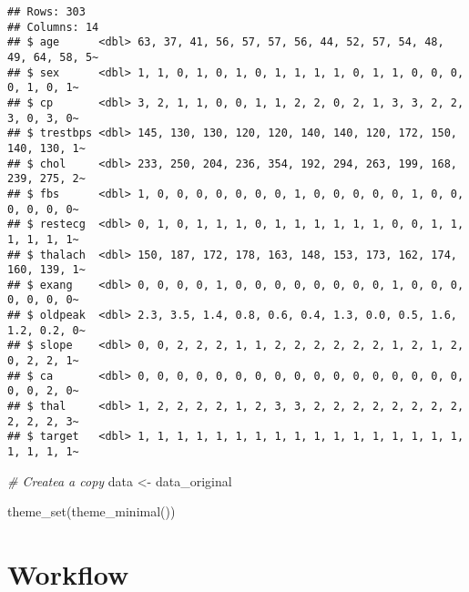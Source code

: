 \documentclass[
]{book}
\newenvironment{Shaded}{\begin{snugshade}}{\end{snugshade}}
\newcommand{\CommentTok}[1]{\textcolor[rgb]{0.56,0.35,0.01}{\textit{#1}}}
\newcommand{\FunctionTok}[1]{\textcolor[rgb]{0.00,0.00,0.00}{#1}}
\newcommand{\NormalTok}[1]{#1}
\newcommand{\OtherTok}[1]{\textcolor[rgb]{0.56,0.35,0.01}{#1}}
\begin{document}
\begin{verbatim}
## Rows: 303
## Columns: 14
## $ age      <dbl> 63, 37, 41, 56, 57, 57, 56, 44, 52, 57, 54, 48, 49, 64, 58, 5~
## $ sex      <dbl> 1, 1, 0, 1, 0, 1, 0, 1, 1, 1, 1, 0, 1, 1, 0, 0, 0, 0, 1, 0, 1~
## $ cp       <dbl> 3, 2, 1, 1, 0, 0, 1, 1, 2, 2, 0, 2, 1, 3, 3, 2, 2, 3, 0, 3, 0~
## $ trestbps <dbl> 145, 130, 130, 120, 120, 140, 140, 120, 172, 150, 140, 130, 1~
## $ chol     <dbl> 233, 250, 204, 236, 354, 192, 294, 263, 199, 168, 239, 275, 2~
## $ fbs      <dbl> 1, 0, 0, 0, 0, 0, 0, 0, 1, 0, 0, 0, 0, 0, 1, 0, 0, 0, 0, 0, 0~
## $ restecg  <dbl> 0, 1, 0, 1, 1, 1, 0, 1, 1, 1, 1, 1, 1, 0, 0, 1, 1, 1, 1, 1, 1~
## $ thalach  <dbl> 150, 187, 172, 178, 163, 148, 153, 173, 162, 174, 160, 139, 1~
## $ exang    <dbl> 0, 0, 0, 0, 1, 0, 0, 0, 0, 0, 0, 0, 0, 1, 0, 0, 0, 0, 0, 0, 0~
## $ oldpeak  <dbl> 2.3, 3.5, 1.4, 0.8, 0.6, 0.4, 1.3, 0.0, 0.5, 1.6, 1.2, 0.2, 0~
## $ slope    <dbl> 0, 0, 2, 2, 2, 1, 1, 2, 2, 2, 2, 2, 2, 1, 2, 1, 2, 0, 2, 2, 1~
## $ ca       <dbl> 0, 0, 0, 0, 0, 0, 0, 0, 0, 0, 0, 0, 0, 0, 0, 0, 0, 0, 0, 2, 0~
## $ thal     <dbl> 1, 2, 2, 2, 2, 1, 2, 3, 3, 2, 2, 2, 2, 2, 2, 2, 2, 2, 2, 2, 3~
## $ target   <dbl> 1, 1, 1, 1, 1, 1, 1, 1, 1, 1, 1, 1, 1, 1, 1, 1, 1, 1, 1, 1, 1~
\end{verbatim}

\begin{Shaded}
\begin{Highlighting}[]
\CommentTok{\# Createa a copy}
\NormalTok{data }\OtherTok{\textless{}{-}}\NormalTok{ data\_original}

\FunctionTok{theme\_set}\NormalTok{(}\FunctionTok{theme\_minimal}\NormalTok{())}
\end{Highlighting}
\end{Shaded}

\hypertarget{workflow-3}{%
\section{Workflow}\label{workflow-3}}
\end{document}
